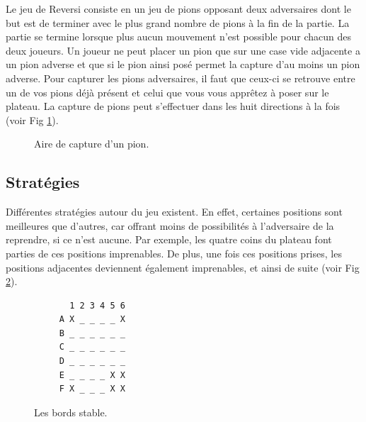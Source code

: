 \documentclass[10pt,a4paper]{article}
\begin{document}
Le jeu de Reversi consiste en un jeu de pions opposant deux adversaires dont le but est de terminer avec le plus grand nombre de pions à la fin de la partie. La partie se termine lorsque plus aucun mouvement n'est possible pour chacun des deux joueurs. Un joueur ne peut placer un pion que sur une case vide adjacente a un pion adverse et que si le pion ainsi posé permet la capture d'au moins un pion adverse. Pour capturer les pions adversaires, il faut que ceux-ci se retrouve entre un de vos pions déjà présent et celui que vous vous apprêtez à poser sur le plateau. La capture de pions peut s'effectuer dans les huit directions à la fois (voir Fig \ref{fig:aire_de_capture}).
 \begin{figure}[H]    
    \centering
{}
    \caption {Aire de capture d'un pion.\label{fig:aire_de_capture}}
    \end{figure}
\subsection{Stratégies}
Différentes stratégies autour du jeu existent. En effet, certaines positions sont meilleures que d'autres, car offrant moins de possibilités à l'adversaire de la reprendre, si ce n'est aucune. Par exemple, les quatre coins du plateau font parties de ces positions imprenables. De plus, une fois ces positions prises, les positions adjacentes deviennent également imprenables, et ainsi de suite (voir Fig \ref{fig:bord_stable}).

 \begin{figure}[H]    
    \centering
    \begin{BVerbatim}
       1 2 3 4 5 6
     A X _ _ _ _ X
     B _ _ _ _ _ _
     C _ _ _ _ _ _
     D _ _ _ _ _ _
     E _ _ _ _ X X
     F X _ _ _ X X 
    \end{BVerbatim}
    \caption {Les bords stable.\label{fig:bord_stable}}
    \end{figure}
\end{document}
